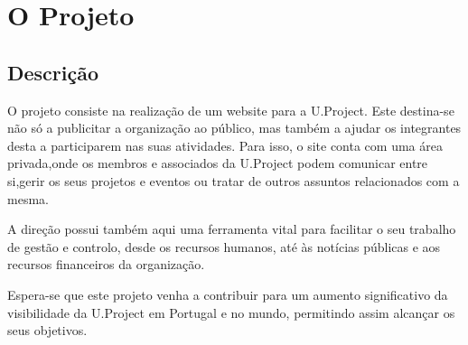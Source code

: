 \documentclass[11pt]{report}
\begin{document}
\newpage

\chapter{O Projeto}
\section{Descrição}
O projeto consiste na realização de um website para a U.Project. Este destina-se não só a publicitar a organização ao público, mas também a ajudar os integrantes desta a participarem nas suas atividades. Para isso, o site conta com uma área privada,onde os membros e associados da U.Project podem comunicar entre si,gerir os seus projetos e eventos ou tratar de outros assuntos relacionados com a mesma.

A direção possui também aqui uma ferramenta vital para facilitar o seu trabalho de gestão e controlo, desde os recursos humanos, até às notícias públicas e aos recursos financeiros da organização.

Espera-se que este projeto venha a contribuir para um aumento significativo da visibilidade da U.Project em Portugal e no mundo, permitindo assim alcançar os seus objetivos.
\end{document}
